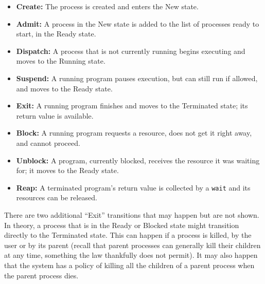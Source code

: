 \begin{itemize}
	\item \textbf{Create:} The process is created and enters the New state.
	\item \textbf{Admit:} A process in the New state is added to the list of processes ready to start, in the Ready state.
	\item \textbf{Dispatch:} A process that is not currently running begins executing and moves to the Running state.
	\item \textbf{Suspend:} A running program pauses execution, but can still run if allowed, and moves to the Ready state.
	\item \textbf{Exit:} A running program finishes and moves to the Terminated state; its return value is available.
	\item \textbf{Block:} A running program requests a resource, does not get it right away, and cannot proceed.
	\item \textbf{Unblock:} A program, currently blocked, receives the resource it was waiting for; it moves to the Ready state.
	\item \textbf{Reap:} A terminated program's return value is collected by a \texttt{wait} and its resources can be released.
\end{itemize}

There are two additional ``Exit'' transitions that may happen but are not shown. In theory, a process that is in the Ready or Blocked state might transition directly to the Terminated state. This can happen if a process is killed, by the user or by its parent (recall that parent processes can generally kill their children at any time, something the law thankfully does not permit). It may also happen that the system has a policy of killing all the children of a parent process when the parent process dies.






